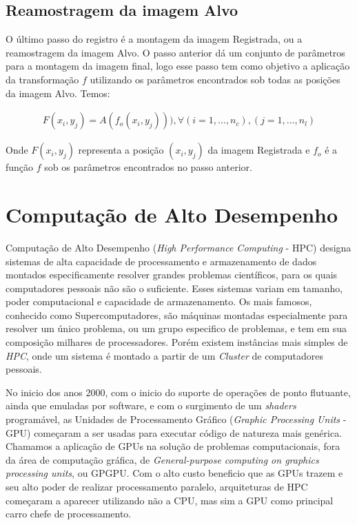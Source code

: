 \subsection{Reamostragem da imagem Alvo}

O último passo do registro é a montagem da imagem Registrada, ou a reamostragem da imagem Alvo. O passo anterior
dá um conjunto de parâmetros para a montagem da imagem final, logo esse passo tem como objetivo a aplicação
da transformação $f$ utilizando os parâmetros encontrados sob todas as posições da imagem Alvo. Temos:

\begin{align}\label{eq:reamostragem}
    F(x_i,y_j) = A(f_o(x_i,y_j))), \forall (i = 1, \dots, n_c), (j = 1, \dots, n_l)
\end{align}

    Onde $F(x_i,y_j)$ representa a posição $(x_i,y_j)$ da imagem Registrada e $f_o$ é a função $f$ sob os parâmetros
encontrados no passo anterior.

\section{Computação de Alto Desempenho}\label{GPGPU}
    
    Computação de Alto Desempenho (\textit{High Performance Computing} - HPC) designa sistemas de alta capacidade de processamento
e armazenamento de dados montados especificamente resolver grandes problemas científicos, para os quais computadores pessoais não
são o suficiente. Esses sistemas variam em tamanho, poder computacional e capacidade de armazenamento. Os mais famosos,
conhecido como Supercomputadores, são máquinas montadas especialmente para resolver um único problema, ou um grupo
especifico de problemas, e tem em sua composição milhares de processadores. Porém existem instâncias mais simples de 
\textit{HPC}, onde um sistema é montado a partir de um \textit{Cluster} de computadores pessoais.

    No inicio dos anos 2000, com o inicio do suporte de operações de ponto flutuante, ainda que emuladas por software, 
e com o surgimento de um \textit{shaders} programável, as Unidades de Processamento Gráfico 
(\textit{Graphic Processing Units} - GPU) começaram a ser usadas para executar código de natureza mais genérica.
Chamamos a aplicação de GPUs na solução de problemas computacionais, fora da área de computação gráfica, 
de \textit{General-purpose computing on graphics processing units}, ou GPGPU. Com o alto custo beneficio que as GPUs 
trazem e seu alto poder de realizar processamento paralelo, arquiteturas de HPC começaram a aparecer utilizando não a 
CPU, mas sim a GPU como principal carro chefe de processamento.

